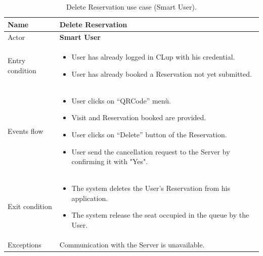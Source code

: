 \begin{table}[H]\begin{tabular}{|p{5cm} | p{7cm} | }
	\hline
	Name & \textbf{Delete Reservation} \\
	\hline
	Actor & \textbf{Smart User} \\
	\hline
	Entry condition &
	\begin{itemize}
		\item User has already logged in CLup with his credential. 
		\item User has already booked a Reservation not yet submitted.
	\end{itemize} \\
	\hline
	Events flow & 
	\begin{itemize}
		\item User clicks on “QRCode” menù.
		\item Visit and Reservation booked are provided.
		\item User clicks on “Delete” button of the Reservation.
		\item User send the cancellation request to the Server by confirming it with "Yes".
	\end{itemize} \\
	\hline
	Exit condition &
	\begin{itemize}	
		\item The system deletes the User's Reservation from his application.
		\item The system release the seat occupied in the queue by the User.
	\end{itemize} \\
	\hline 
	Exceptions & Communication with the Server is unavailable.\\
	\hline
\end{tabular}
\caption{Delete Reservation use case (Smart User).}
\end{table}

\bigbreak


